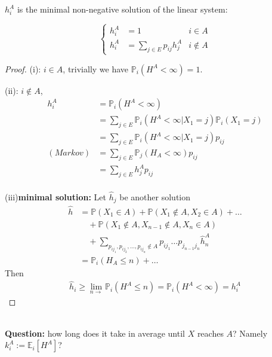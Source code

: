 \begin{theorem}
$h_i^A$ is the minimal non-negative solution of the linear system:

\begin{equation*}
\left\{
\begin{aligned}
	h_i^A &= 1 						   &i \in A\\
	h_i^A &= \sum_{j \in E}p_{ij}h_j^A &i \notin A
\end{aligned}
\right.	
\end{equation*}
\end{theorem}
\begin{proof}
(i): $i \in A$, trivially we have $\mathbb{P}_i(H^A < \infty) = 1$.

(ii): $i \notin A$,  
\begin{align*}
	h_i^A &= \mathbb{P}_i (H^A < \infty) \\
	&= \sum_{j \in E}\mathbb{P}_i(H^A< \infty|X_1 = j)\mathbb{P}_i(X_1 = j) \\
	&= \sum_{j \in E}\mathbb{P}_i(H^A< \infty|X_1 = j) p_{ij}\\
	(Markov)&= \sum_{j \in E}\mathbb{P}_j(H_A< \infty)p_{ij}\\
	&= \sum_{j \in E}h_j^A p_{ij}
\end{align*} \\
(iii)\textbf{minimal solution:} Let $\hat{h}_j$ be another solution
\begin{align*}
	\hat{h} &= \mathbb{P}(X_1 \in A) + \mathbb{P}(X_1 \notin A, X_2 \in A) + \dots \\
	&\quad + \mathbb{P}(X_1 \notin A, X_{n-1}\notin A, X_n \in A)\\
	&\quad + \sum_{p_{ij_1}, p_{ij_2}, \dots, p_{ij_n} \notin A}
	p_{ij_1} \dots p_{j_{n-1}j_n}\hat{h}_n^A\\
	&=  \mathbb{P}_i(H_A \le n) + \dots
\end{align*}
Then
\begin{align*}
	\hat{h}_i \geq \lim_{n \rightarrow}\mathbb{P}_i(H^A \le n) = \mathbb{P}_i(H^A < \infty) = h_i^A
\end{align*}
\end{proof}

\quad\\
\textbf{Question:} how long does it take in average until $X$ reaches $A$? Namely $k_i^A:= \mathbb{E}_i[H^A]$?

